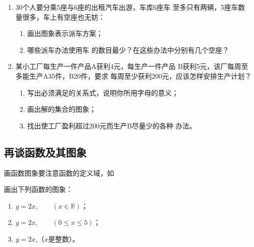 \begin{enumerate}
\item 
30个人要分乘5座与6座的出租汽车出游，车库6座车
至多只有两辆，5座车数量很多，车上有空座也无妨：
\begin{enumerate}
    \item 画出图象表示派车方案；
    \item 哪些派车办法使用车
的数目最少？在这些办法中分别有几个空座？
\end{enumerate}

\item 某小工厂每生产一件产品A获利4元，每生产一件产品
B获利5元，该厂每周至多能生产A35件，B20件，要求
每周至少获利200元，应该怎样安排生产计划？
\begin{enumerate}
    \item 写出必须满足的关系式，说明你所用字母的意义；
    \item 画出解的集合的图象；
    \item 找出使工厂盈利超过200元而生产B尽量少的各种
办法。
\end{enumerate}
\end{enumerate}

\subsection{再谈函数及其图象}
画函数图象要注意函数的定义域，如

\begin{example}
    画出下列函数的图象：
    \begin{enumerate}
        \item $y=2x,\qquad (x\in\mathbb{R})$；
        \item $y=2x,\qquad (0\le x\le 5)$；
        \item $y=2x$,\qquad （$x$是整数）。
    \end{enumerate}
\end{example}


